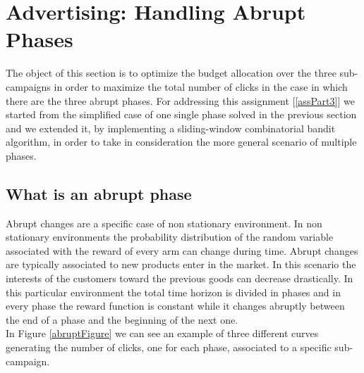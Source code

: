 \chapter{Advertising: Handling Abrupt Phases}

The object of this section is to optimize the budget allocation over the three sub-campaigns in order to maximize the total number of clicks in the case in which there are the three abrupt phases.
For addressing this assignment [\ref{assPart3}] we started from the simplified case of one single phase solved in the previous section and we extended it, by implementing a sliding-window combinatorial bandit algorithm, in order to take in consideration the more general scenario of multiple phases.\\


\section{What is an abrupt phase}
Abrupt changes are a specific case of non stationary environment.
In non stationary environments the probability distribution of the random variable associated with the reward of every arm can change during time.
Abrupt changes are typically associated to new products enter in the market. In this scenario the interests of the customers toward the previous goods can decrease drastically.
In this particular environment the total time horizon is divided in phases and in every phase the reward function is constant while it changes abruptly between the end of a phase and the beginning of the next one.\\ In Figure \ref{abruptFigure} we can see an example of three different curves generating the number of clicks, one for each phase, associated to a specific sub-campaign.
